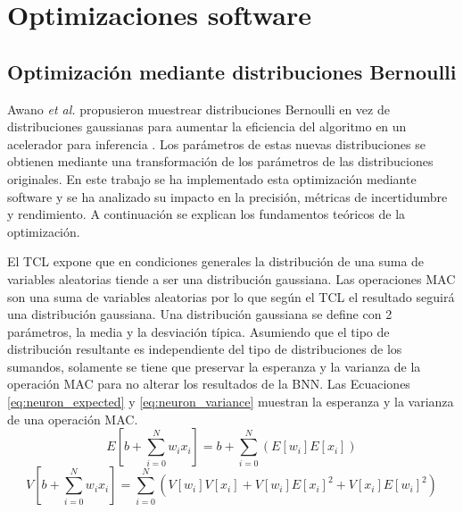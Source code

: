 \chapter{Optimizaciones software} \label{ch:optimizaciones}

\section{Optimización mediante distribuciones Bernoulli}

Awano \emph{et al.} propusieron muestrear distribuciones Bernoulli en vez de distribuciones gaussianas para aumentar la eficiencia del algoritmo en un acelerador para inferencia \cite{bnn_clt_approx}. Los parámetros de estas nuevas distribuciones se obtienen mediante una transformación de los parámetros de las distribuciones originales. En este trabajo se ha implementado esta optimización mediante software y se ha analizado su impacto en la precisión, métricas de incertidumbre y rendimiento. A continuación se explican los fundamentos teóricos de la optimización.

El TCL expone que en condiciones generales la distribución de una suma de variables aleatorias tiende a ser una distribución gaussiana. Las operaciones MAC son una suma de variables aleatorias por lo que según el TCL el resultado seguirá una distribución gaussiana. Una distribución gaussiana se define con 2 parámetros, la media y la desviación típica. Asumiendo que el tipo de distribución resultante es independiente del tipo de distribuciones de los sumandos, solamente se tiene que preservar la esperanza y la varianza de la operación MAC para no alterar los resultados de la BNN. Las Ecuaciones \ref{eq:neuron_expected}  y \ref{eq:neuron_variance} muestran la esperanza y la varianza de una operación MAC.
\begin{equation} \label{eq:neuron_expected}
E\left[ b + \sum_{i=0}^N w_i x_i \right]  = b + \sum_{i=0}^N ( E[w_i] E[x_i] )
\end{equation}
\begin{equation} \label{eq:neuron_variance}
V\left[ b + \sum_{i=0}^N w_i x_i \right] = \sum_{i=0}^N ( V[w_i]V[x_i] + V[w_i]E[x_i]^2 + V[x_i]E[w_i]^2 )
\end{equation}

